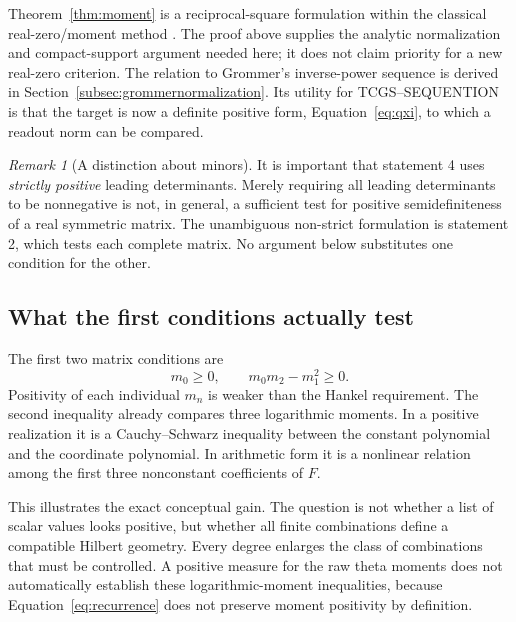 \documentclass[11pt,letterpaper]{article}
\numberwithin{equation}{section}
\theoremstyle{definition}
\theoremstyle{remark}
\newtheorem{remark}[theorem]{Remark}
\begin{document}
Theorem~\ref{thm:moment} is a reciprocal-square formulation within the classical real-zero/moment method \cite{grommer,schmudgen,bariczstampach}. The proof above supplies the analytic normalization and compact-support argument needed here; it does not claim priority for a new real-zero criterion. The relation to Grommer's inverse-power sequence is derived in Section~\ref{subsec:grommernormalization}. Its utility for TCGS--SEQUENTION is that the target is now a definite positive form, Equation~\eqref{eq:qxi}, to which a readout norm can be compared.

\begin{remark}[A distinction about minors]
It is important that statement 4 uses \emph{strictly positive} leading determinants. Merely requiring all leading determinants to be nonnegative is not, in general, a sufficient test for positive semidefiniteness of a real symmetric matrix. The unambiguous non-strict formulation is statement 2, which tests each complete matrix. No argument below substitutes one condition for the other.
\end{remark}

\subsection{What the first conditions actually test}
The first two matrix conditions are
\begin{equation}
 m_0\geq0,\qquad m_0m_2-m_1^2\geq0.
 \label{eq:lowconditions}
\end{equation}
Positivity of each individual $m_n$ is weaker than the Hankel requirement. The second inequality already compares three logarithmic moments. In a positive realization it is a Cauchy--Schwarz inequality between the constant polynomial and the coordinate polynomial. In arithmetic form it is a nonlinear relation among the first three nonconstant coefficients of $F$.

This illustrates the exact conceptual gain. The question is not whether a list of scalar values looks positive, but whether all finite combinations define a compatible Hilbert geometry. Every degree enlarges the class of combinations that must be controlled. A positive measure for the raw theta moments does not automatically establish these logarithmic-moment inequalities, because Equation~\eqref{eq:recurrence} does not preserve moment positivity by definition.
\end{document}
